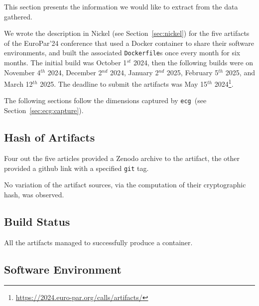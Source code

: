 \documentclass[sigconf,natbib=false]{acmart}
\newcommand{\df}{\texttt{Dockerfile}}
\newcommand{\ecg}{\texttt{ecg}}
\newcommand{\todo}[1]{{\color{red}{TODO: #1}}}
\begin{document}
This section presents the information we would like to extract from the data gathered.


We wrote the description in Nickel (see Section~\ref{sec:nickel}) for the five artifacts of the EuroPar'24 conference that used a Docker container to share their software environments, and built the associated \df s once every month for six months.
The initial build was October 1$^{st}$ 2024, then the following builds were on November 4$^{th}$ 2024, December 2$^{nd}$ 2024, January 2$^{nd}$ 2025, February 5$^{th}$ 2025, and March 12$^{th}$ 2025.
The deadline to submit the artifacts was May 15$^{th}$ 2024\footnote{\url{https://2024.euro-par.org/calls/artifacts/}}.

The following sections follow the dimensions captured by \ecg\ (see Section~\ref{sec:ecg:capture}).

\subsection{Hash of Artifacts}

Four out the five articles provided a Zenodo archive to the artifact, the other provided a github link with a specified \texttt{git} tag.

No variation of the artifact sources, via the computation of their cryptographic hash, was observed.

\subsection{Build Status}

All the artifacts managed to successfully produce a container.

\subsection{Software Environment}

\begin{table}
  \centering
  \caption{Information about the \df s from the study}\label{tab:info}
\end{table}
\end{document}
